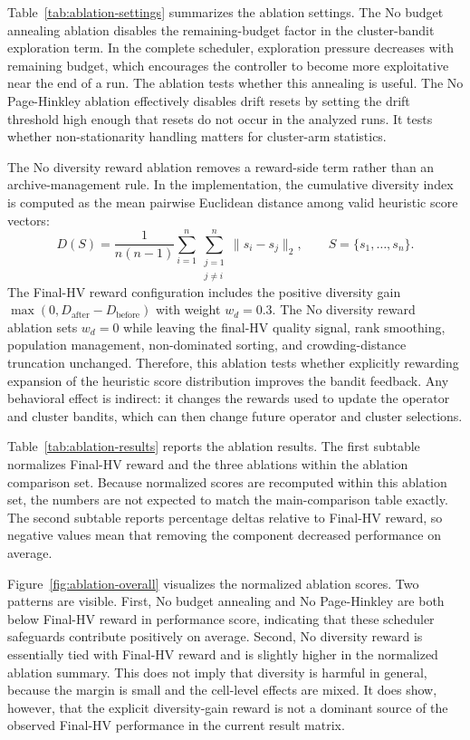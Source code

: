 Table~\ref{tab:ablation-settings} summarizes the ablation settings. The No budget annealing ablation disables the remaining-budget factor in the cluster-bandit exploration term. In the complete scheduler, exploration pressure decreases with remaining budget, which encourages the controller to become more exploitative near the end of a run. The ablation tests whether this annealing is useful. The No Page-Hinkley ablation effectively disables drift resets by setting the drift threshold high enough that resets do not occur in the analyzed runs. It tests whether non-stationarity handling matters for cluster-arm statistics.

The No diversity reward ablation removes a reward-side term rather than an archive-management rule. In the implementation, the cumulative diversity index is computed as the mean pairwise Euclidean distance among valid heuristic score vectors:
\begin{equation}
  D(S)
  =
  \frac{1}{n(n-1)}
  \sum_{i=1}^{n}
  \sum_{\substack{j=1\\j\ne i}}^{n}
  \lVert s_i-s_j\rVert_2,
  \qquad S=\{s_1,\ldots,s_n\}.
  \label{eq:cdi-ablation-chapter5}
\end{equation}
The Final-HV reward configuration includes the positive diversity gain $\max(0,D_{\mathrm{after}}-D_{\mathrm{before}})$ with weight $w_d=0.3$. The No diversity reward ablation sets $w_d=0$ while leaving the final-HV quality signal, rank smoothing, population management, non-dominated sorting, and crowding-distance truncation unchanged. Therefore, this ablation tests whether explicitly rewarding expansion of the heuristic score distribution improves the bandit feedback. Any behavioral effect is indirect: it changes the rewards used to update the operator and cluster bandits, which can then change future operator and cluster selections.



Table~\ref{tab:ablation-results} reports the ablation results. The first subtable normalizes Final-HV reward and the three ablations within the ablation comparison set. Because normalized scores are recomputed within this ablation set, the numbers are not expected to match the main-comparison table exactly. The second subtable reports percentage deltas relative to Final-HV reward, so negative values mean that removing the component decreased performance on average.



Figure~\ref{fig:ablation-overall} visualizes the normalized ablation scores. Two patterns are visible. First, No budget annealing and No Page-Hinkley are both below Final-HV reward in performance score, indicating that these scheduler safeguards contribute positively on average. Second, No diversity reward is essentially tied with Final-HV reward and is slightly higher in the normalized ablation summary. This does not imply that diversity is harmful in general, because the margin is small and the cell-level effects are mixed. It does show, however, that the explicit diversity-gain reward is not a dominant source of the observed Final-HV performance in the current result matrix.

